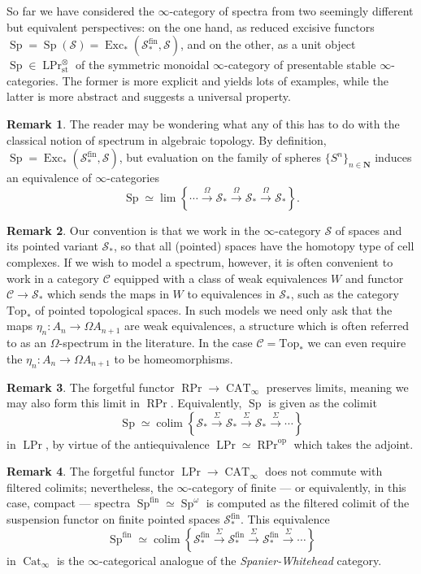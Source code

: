 \documentclass{article}
\theoremstyle{definition}
\newtheorem{remark}{Remark}[subsection]
\newcommand{\C}{\mathcal{C}}
\renewcommand{\S}{\mathcal{S}}
\newcommand{\NN}{\mathbf{N}}
\renewcommand{\i}{\infty}
\newcommand{\too}{\longrightarrow}
\newcommand{\op}{\mathrm{op}}
\DeclareMathOperator{\Cat}{Cat}
\DeclareMathOperator{\CAT}{CAT}
\DeclareMathOperator{\Exc}{Exc}
\DeclareMathOperator{\colim}{colim}
\DeclareMathOperator{\Prl}{LPr}
\DeclareMathOperator{\Prr}{RPr}
\DeclareMathOperator{\Sp}{Sp}
\newcommand{\st}{\mathrm{st}}
\DeclareMathOperator{\fin}{fin}
\begin{document}
So far we have considered the $\i$-category of spectra from two seemingly different but equivalent perspectives: on the one hand, as reduced excisive functors $\Sp=\Sp(\S)=\Exc_*(\S^{\fin}_*,\S)$, and on the other, as a unit object $\Sp\in\Prl^\otimes_{\st}$ of the symmetric monoidal $\i$-category of presentable stable $\i$-categories.
The former  is more explicit and yields lots of examples, while the latter is more abstract and suggests a universal property.

\begin{remark}
The reader may be wondering what any of this has to do with the classical notion of spectrum in algebraic topology.
By definition, $\Sp=\Exc_*(\S^{\fin}_*,\S)$, but evaluation on the family of spheres $\{S^n\}_{n\in\NN}$ induces an equivalence of $\i$-categories
\[
\Sp\simeq\lim\left\{\cdots\overset{\Omega}{\too}\S_*\overset{\Omega}{\too}\S_*\overset{\Omega}{\too}\S_*\right\}.
\]
\end{remark}

\begin{remark}
Our convention is that we work in the $\infty$-category $\S$ of spaces and its pointed variant $\S_*$, so that all (pointed) spaces have the homotopy type of cell complexes.
If we wish to model a spectrum, however, it is often convenient to work in a category $\C$ equipped with a class of weak equivalences $W$ and functor $\C\to\S_*$ which sends the maps in $W$ to equivalences in $\S_*$, such as the category $\mathrm{Top}_*$ of pointed topological spaces.
In such models we need only ask that the maps $\eta_n:A_n\to\Omega A_{n+1}$ are weak equivalences, a structure which is often referred to as an $\Omega$-spectrum in the literature.
In the case $\C=\mathrm{Top}_*$ we can even require the $\eta_n:A_n\to\Omega A_{n+1}$ to be homeomorphisms.
\end{remark}



\begin{remark}
The forgetful functor $\Prr\to\CAT_\i$ preserves limits, meaning we may also form this limit in $\Prr$. Equivalently, $\Sp$ is given as the colimit
\[
\Sp\simeq\colim\left\{\S_*\overset{\Sigma}{\too}\S_*\overset{\Sigma}{\too}\S_*\overset{\Sigma}{\too}\cdots\right\}
\]
in $\Prl$, by virtue of the antiequivalence $\Prl\simeq\Prr^{\op}$ which takes the adjoint.
\end{remark}

\begin{remark}
The forgetful functor $\Prl\to\CAT_\i$ does not commute with filtered colimits; nevertheless, the $\infty$-category of finite --- or equivalently, in this case, compact --- spectra $\Sp^\mathrm{fin}\simeq\Sp^\omega$ is computed as the filtered colimit of the suspension functor on finite pointed spaces $\S_*^\mathrm{fin}$.
This equivalence
\[
\Sp^\mathrm{fin}\simeq\colim\left\{\S_*^\mathrm{fin}\overset{\Sigma}{\too}\S_*^\mathrm{fin}\overset{\Sigma}{\too}\S_*^\mathrm{fin}\overset{\Sigma}{\too}\cdots\right\}
\]
in $\Cat_\i$ is the $\i$-categorical analogue of the {\em Spanier-Whitehead} category.
\end{remark}
\end{document}
